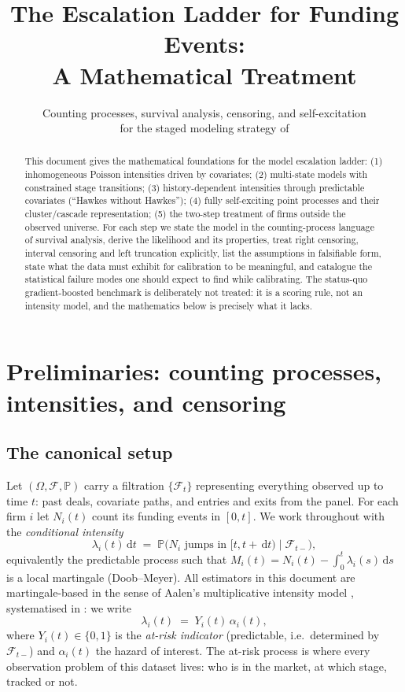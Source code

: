 \documentclass[11pt]{article}
\title{\bfseries The Escalation Ladder for Funding Events:\\[3pt]
A Mathematical Treatment}
\author{Counting processes, survival analysis, censoring, and self-excitation\\
for the staged modeling strategy of \code{STRATEGY.md}}
\date{}
\newcommand{\Prob}{\mathbb{P}}
\newcommand{\dd}{\,\mathrm{d}}
\newcommand{\cF}{\mathcal{F}}
\numberwithin{assumption}{section}
\numberwithin{proposition}{section}
\numberwithin{remark}{section}
\begin{document}
\maketitle

\begin{abstract}\noindent
This document gives the mathematical foundations for the model escalation
ladder: (1) inhomogeneous Poisson intensities driven by covariates; (2)
multi-state models with constrained stage transitions; (3) history-dependent
intensities through predictable covariates (``Hawkes without Hawkes''); (4)
fully self-exciting point processes and their cluster/cascade representation;
(5) the two-step treatment of firms outside the observed universe. For each
step we state the model in the counting-process language of survival analysis,
derive the likelihood and its properties, treat right censoring, interval
censoring and left truncation explicitly, list the assumptions in falsifiable
form, state what the data must exhibit for calibration to be meaningful, and
catalogue the statistical failure modes one should expect to find while
calibrating. The status-quo gradient-boosted benchmark is deliberately not
treated: it is a scoring rule, not an intensity model, and the mathematics
below is precisely what it lacks.
\end{abstract}

\tableofcontents

\section{Preliminaries: counting processes, intensities, and censoring}
\label{sec:prelim}

\subsection{The canonical setup}
Let $(\Omega,\cF,\Prob)$ carry a filtration $\{\cF_t\}$ representing
everything observed up to time $t$: past deals, covariate paths, and entries
and exits from the panel. For each firm $i$ let $N_i(t)$ count its funding
events in $[0,t]$. We work throughout with the \emph{conditional intensity}
\begin{equation}
\lambda_i(t)\dd t \;=\; \Prob\big(N_i \text{ jumps in } [t,t+\dd t) \mid \cF_{t-}\big),
\label{eq:intensity_def}
\end{equation}
equivalently the predictable process such that
$M_i(t)=N_i(t)-\int_0^t \lambda_i(s)\dd s$ is a local martingale
(Doob--Meyer). All estimators in this document are martingale-based in the
sense of Aalen's multiplicative intensity model \citep{aalen1978},
systematised in \citet{abgk1993}: we write
\begin{equation}
\lambda_i(t) \;=\; Y_i(t)\,\alpha_i(t),
\label{eq:aalen}
\end{equation}
where $Y_i(t)\in\{0,1\}$ is the \emph{at-risk indicator} (predictable, i.e.\
determined by $\cF_{t-}$) and $\alpha_i(t)$ the hazard of interest. The
at-risk process is where every observation problem of this dataset lives:
who is in the market, at which stage, tracked or not.
\end{document}
